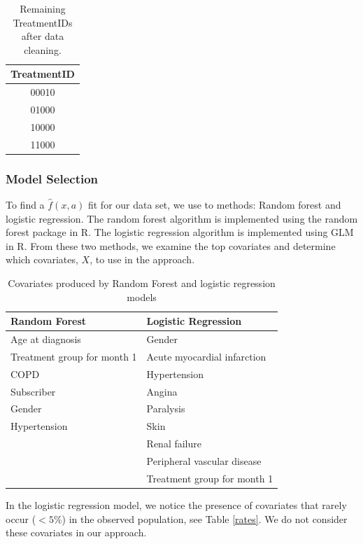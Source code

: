 \documentclass[10pt]{article}
\begin{document}
\begin{table}[H]
	\centering
	\begin{tabular}{c}
		\textbf{TreatmentID} \\
		\hline
		00010 \\
		01000 \\
		10000 \\
		11000 \\
	\end{tabular}
	\caption{Remaining TreatmentIDs after data cleaning.}
	\label{ids1}
\end{table}

\subsubsection{Model Selection}

To find a $\hat{f}(x,a)$ fit for our data set, we use to methods: Random forest and logistic regression. The random forest algorithm is implemented using the random forest package in R. The logistic regression algorithm is implemented using GLM in R. From these two methods, we examine the top covariates and determine which covariates, $X$, to use in the approach.

\begin{table}[H]
	\centering
	\begin{tabular}{l|l}
		\textbf{Random Forest} & \textbf{Logistic Regression} \\
		\hline
		Age at diagnosis & Gender \\
		\hline
		Treatment group for month 1 & Acute myocardial infarction \\
		\hline
		COPD & Hypertension \\
		\hline
		Subscriber & Angina \\
		\hline
		Gender & Paralysis \\
		\hline
		Hypertension & Skin \\
		\hline
		~ & Renal failure \\
		\hline
		~ & Peripheral vascular disease \\
		\hline
		~ & Treatment group for month 1 \\
		\hline
	\end{tabular}
	\caption{Covariates produced by Random Forest and logistic regression models}
\end{table}

In the logistic regression model, we notice the presence of covariates that rarely occur ($<5$\%) in the observed population, see Table \ref{rates}. We do not consider these covariates in our approach.  
\end{document}
